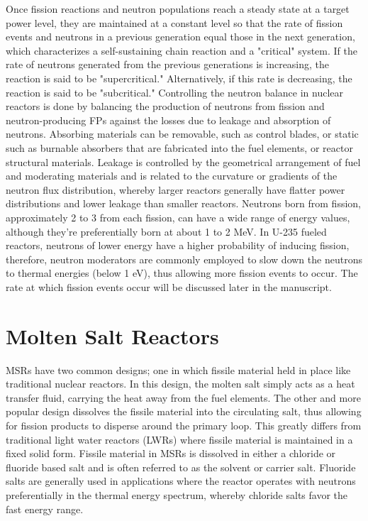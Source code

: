 Once fission reactions and neutron populations reach a steady state at a target power level, they are maintained at a constant level so that the rate of fission events and neutrons in a previous generation equal those in the next generation, which characterizes a self-sustaining chain reaction and a "critical" system. If the rate of neutrons generated from the previous generations is increasing, the reaction is said to be "supercritical." Alternatively, if this rate is decreasing, the reaction is said to be "subcritical." Controlling the neutron balance in nuclear reactors is done by balancing the production of neutrons from fission and neutron-producing FPs against the losses due to leakage and absorption of neutrons. Absorbing materials can be removable, such as control blades, or static such as burnable absorbers that are fabricated into the fuel elements, or reactor structural materials.  Leakage is controlled by the geometrical arrangement of fuel and moderating materials and is related to the curvature or gradients of the neutron flux distribution, whereby larger reactors generally have flatter power distributions and lower leakage than smaller reactors.  Neutrons born from fission, approximately 2 to 3 from each fission, can have a wide range of energy values, although they're preferentially born at about 1 to 2 MeV.  In U-235 fueled reactors, neutrons of lower energy have a higher probability of inducing fission, therefore, neutron moderators are commonly employed to slow down the neutrons to thermal energies (below 1 eV), thus allowing more fission events to occur.  The rate at which fission events occur will be discussed later in the manuscript.  

\section{Molten Salt Reactors}
MSRs have two common designs; one in which fissile material held in place like traditional nuclear reactors. In this design, the molten salt simply acts as a heat transfer fluid, carrying the heat away from the fuel elements. The other and more popular design dissolves the fissile material into the circulating salt, thus allowing for fission products to disperse around the primary loop.  This greatly differs from traditional light water reactors (LWRs) where fissile material is maintained in a fixed solid form. Fissile material in MSRs is dissolved in either a chloride or fluoride based salt and is often referred to as the solvent or carrier salt. Fluoride salts are generally used in applications where the reactor operates with neutrons preferentially in the thermal energy spectrum, whereby chloride salts favor the fast energy range.


